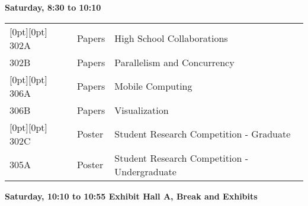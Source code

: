 \noindent
{\sffamily\bfseries Saturday, 8:30 to 10:10}\newline\noindent
\begin{tabular*}{5in}{@{}p{0.5in}@{}p{0.75in}@{}p{3.75in}}

\rowcolor[gray]{0.9}[0pt][0pt] 302A & Papers & High School Collaborations \\

302B & Papers & Parallelism and Concurrency \\

\rowcolor[gray]{0.9}[0pt][0pt] 306A & Papers & Mobile Computing \\

306B & Papers & Visualization \\

\rowcolor[gray]{0.9}[0pt][0pt] 302C & Poster & Student Research Competition - Graduate \\

305A & Poster & Student Research Competition - Undergraduate \\
\end{tabular*}\newline





\noindent
{\sffamily\bfseries Saturday, 10:10 to 10:55 Exhibit Hall A, Break and Exhibits}\newline\noindent


